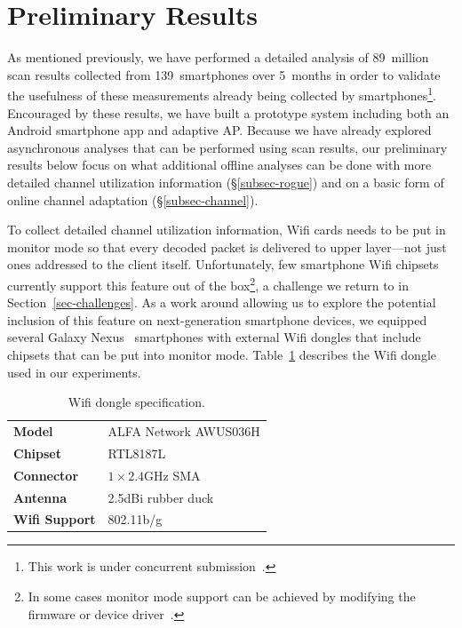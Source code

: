 \section{Preliminary Results}
\label{sec-results}

As mentioned previously, we have performed a detailed analysis of 89~million
scan results collected from 139~smartphones over 5~months in order to
validate the usefulness of these measurements already being collected by
smartphones\footnote{This work is under concurrent
submission~\cite{conext14-pocketsniffer}.}. Encouraged by these results, we
have built a prototype \PS{} system including both an Android smartphone app
and adaptive AP. Because we have already explored asynchronous analyses that
can be performed using scan results, our preliminary results below focus on
what additional offline analyses can be done with more detailed channel
utilization information (\S\ref{subsec-rogue}) and on a basic form of online
channel adaptation (\S\ref{subsec-channel}).

To collect detailed channel utilization information, Wifi cards needs to be
put in monitor mode so that every decoded packet is delivered to upper
layer---not just ones addressed to the client itself. Unfortunately, few
smartphone Wifi chipsets currently support this feature out of the
box\footnote{In some cases monitor mode support can be achieved by modifying
the firmware or device driver~\cite{bcmon}.}, a challenge we return to in
Section~\ref{sec-challenges}. As a work around allowing us to explore the
potential inclusion of this feature on next-generation smartphone devices, we
equipped several Galaxy Nexus~\cite{galaxynexus} smartphones with external
Wifi dongles that include chipsets that can be put into monitor mode.
Table~\ref{tab:dongle} describes the Wifi dongle used in our experiments.

\begin{table}[t!]
  \centering
  \begin{tabular}{ll}
    \toprule
    \textbf{Model} & ALFA Network AWUS036H \\
    \textbf{Chipset} & RTL8187L \\
    \textbf{Connector} & $1\times2.4$GHz SMA \\
    \textbf{Antenna} & 2.5dBi rubber duck \\
    \textbf{Wifi Support} & 802.11b/g \\
    \bottomrule
  \end{tabular}
  \caption{Wifi dongle specification.}
  \label{tab:dongle}
  \vspace*{-0.1in}
\end{table}


